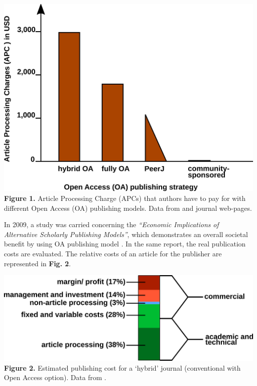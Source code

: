 \documentclass[10pt,fleqn]{wlpeerj}
\begin{document}
\includegraphics{fig-OA-strategies-APCs.png}
\textbf{Figure
1.}
Article
Processing
Charge
(APCs)
that
authors
have
to
pay
for
with
different
Open
Access
(OA)
publishing
models.
Data
from
\citep{solomon_article_2016}
and
journal
web-pages.

In
2009,
a
study
was
carried
concerning
the
\emph{``Economic
Implications
of
Alternative
Scholarly
Publishing
Models''},
which
demonstrates
an
overall
societal
benefit
by
using
OA
publishing
model
\citep{houghton_economic_2009}.
In
the
same
report,
the
real
publication
costs
are
evaluated.
The
relative
costs
of an
article
for
the
publisher
are
represented
in
\textbf{Fig.
2}.

\includegraphics{fig-hybrid-publishing-costs.png}
\textbf{Figure
2.}
Estimated
publishing
cost
for a
`hybrid'
journal
(conventional
with
Open
Access
option).
Data
from
\citep{houghton_economic_2009}.
\end{document}
